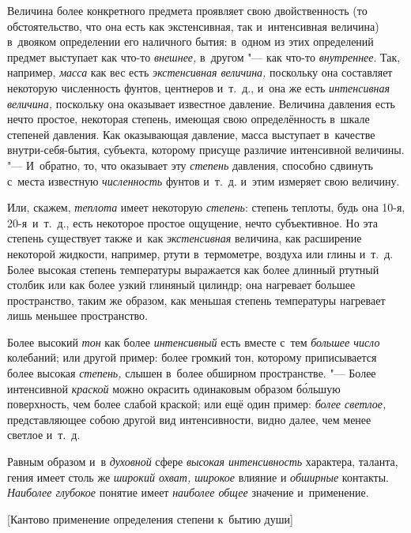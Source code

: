 Величина более конкретного предмета проявляет свою двойственность (то
обстоятельство, что она есть как экстенсивная, так и~интенсивная величина)
в~двояком определении его наличного бытия: в~одном из этих определений
предмет выступает как что-то {\em внешнее,} в~другом "--- как что-то
{\em внутреннее}. Так, например, {\em масса} как вес есть {\em экстенсивная
величина,} поскольку она составляет некоторую численность фунтов, центнеров
и~т.~д., и~она же есть {\em интенсивная величина,} поскольку она оказывает
известное давление. Величина давления есть нечто простое, некоторая степень,
имеющая свою определённость в~шкале степеней давления. Как оказывающая
давление, масса выступает в~качестве внутри-себя-бытия, субъекта, которому
присуще различие интенсивной величины. "--- И~обратно, то, что оказывает эту
{\em степень} давления, способно сдвинуть с~места известную {\em численность}
фунтов и~т.~д. и~этим измеряет свою величину.

Или, скажем, {\em теплота} имеет некоторую {\em степень}: степень теплоты, будь
она 10-я, 20-я~и~т.~д., есть некоторое простое ощущение, нечто субъективное. Но
эта степень существует также и~как {\em экстенсивная} величина, как расширение
некоторой жидкости, например, ртути в~термометре, воздуха или глины и~т.~д.
Более высокая степень температуры выражается как более длинный ртутный столбик
или как более узкий глиняный цилиндр; она нагревает большее пространство,
таким же образом, как меньшая степень температуры нагревает лишь меньшее
пространство.

Более высокий {\em тон} как более {\em интенсивный} есть вместе с~тем
{\em большее число} колебаний; или другой пример: более громкий тон,
которому приписывается более высокая {\em степень,} слышен в~более обширном
пространстве. "--- Более интенсивной {\em краской} можно окрасить одинаковым
образом б\'{о}льшую поверхность, чем более слабой краской; или ещё один пример:
{\em более светлое,} представляющее собою другой вид интенсивности, видно
далее, чем менее светлое и~т.~д.

Равным образом и~в {\em духовной} сфере {\em высокая интенсивность} характера,
таланта, гения имеет столь же {\em широкий охват, широкое}
влияние и {\em обширные} контакты.
{\em Наиболее глубокое} понятие имеет {\em наиболее общее}
значение и~применение.

%
{[Кантово применение определения степени к~бытию души]}

